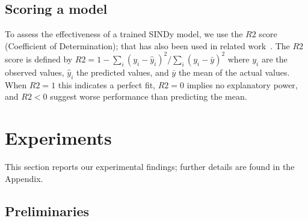 \documentclass{article}
\begin{document}
\subsection{Scoring a model}\label{sec:scoring}

To assess the effectiveness of a trained SINDy model, we use the $R2$ score (Coefficient of Determination); that has also been used in related work~\cite{deSilva2020, Mengge24, ascoli2024odeformer}. 
The $R2$ score is defined by
$R2 = 1 - \sum_{i} (y_i - \widehat{y}_i)^2/\sum_{i} (y_i - \bar{y})^2$ where $y_i$ are the observed values, $\widehat{y}_i$ the predicted values, and $\bar{y}$ the mean of the actual values. 
When $R2=1$ this indicates a perfect fit, $R2=0$ implies no explanatory power, and $R2<0$ suggest worse performance than predicting the mean.


\section{Experiments}

This section reports our experimental findings; further details are found in the Appendix.

\subsection{Preliminaries}\label{sec:preliminaries}
\end{document}
